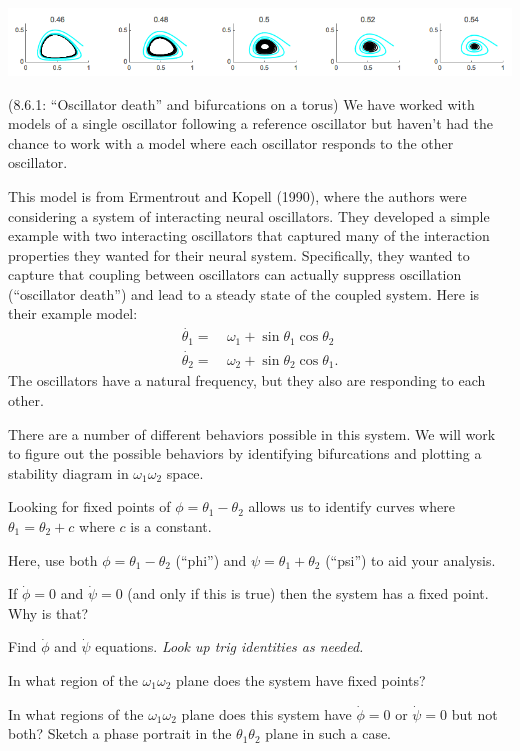 \documentclass[12pt,letterpaper,noanswers]{exam}
\begin{document}
\begin{questions}
\begin{parts}
\includegraphics[width=6in]{img/S19C17p1.png}

\end{parts}


\question (8.6.1: ``Oscillator death'' and bifurcations on a torus)  We have worked with models of a single oscillator following a reference oscillator but haven't had the chance to work with a model where each oscillator responds to the other oscillator.

This model is from Ermentrout and Kopell (1990), where the authors were considering a system of interacting neural oscillators.  They developed a simple example with two interacting oscillators that captured many of the interaction properties they wanted for their neural system.  Specifically, they wanted to capture that coupling between oscillators can actually suppress oscillation (``oscillator death'') and lead to a steady state of the coupled system.  Here is their example model:
\begin{align*}
\dot{\theta_1} = &\ \omega_1 + \sin \theta_1 \cos\theta_2 \\
\dot{\theta_2} = &\ \omega_2 + \sin \theta_2 \cos\theta_1.
\end{align*}
The oscillators have a natural frequency, but they also are responding to each other.

There are a number of different behaviors possible in this system.
We will work to figure out the possible behaviors by identifying bifurcations and  plotting a stability diagram in $\omega_1\omega_2$ space.

\begin{parts}
\item Looking for fixed points of $\phi = \theta_1-\theta_2$ allows us to identify curves where $\theta_1 = \theta_2 + c$ where $c$ is a constant. 

Here, use both $\phi = \theta_1 - \theta_2$ (``phi'') and $\psi = \theta_1 + \theta_2$ (``psi'') to aid your analysis.  

If $\dot{\phi} = 0$ and $\dot{\psi} = 0$ (and only if this is true) then the system has a fixed point.  Why is that?
\item Find $\dot{\phi}$ and $\dot{\psi}$ equations.  \emph{Look up trig identities as needed.}
\item In what region of the $\omega_1\omega_2$ plane does the system have fixed points?
\item In what regions of the $\omega_1\omega_2$ plane does this system have $\dot{\phi} = 0$ or $\dot{\psi} = 0$ but not both?  Sketch a phase portrait in the $\theta_1\theta_2$ plane in such a case.
\end{parts} 

\end{questions}
\end{document}
